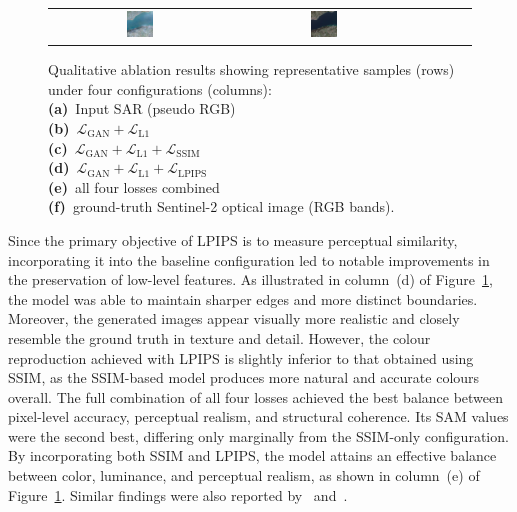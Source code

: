 \begin{figure}[!htbp]
\begin{tabular}{*{6}{c}}
        \includegraphics[width=0.155\textwidth]{img/ablation/sample_4/all.png}   &
        \includegraphics[width=0.155\textwidth]{img/ablation/sample_4/gt.png}                                  \\
    \end{tabular}

    \caption[Qualitative ablation study across loss configurations]{%
    Qualitative ablation results showing representative samples (rows) under four configurations (columns):\\
    \textbf{(a)}~Input SAR (pseudo RGB)\\
    \textbf{(b)}~$\mathcal{L}_{\text{GAN}}{+}\mathcal{L}_{\text{L1}}$\\
    \textbf{(c)}~$\mathcal{L}_{\text{GAN}}{+}\mathcal{L}_{\text{L1}}{+}\mathcal{L}_{\text{SSIM}}$\\
    \textbf{(d)}~$\mathcal{L}_{\text{GAN}}{+}\mathcal{L}_{\text{L1}}{+}\mathcal{L}_{\text{LPIPS}}$\\
    \textbf{(e)}~all four losses combined\\
    \textbf{(f)}~ground-truth Sentinel-2 optical image (RGB bands).
    }
    \label{fig:ablation_samples}
\end{figure}

Since the primary objective of LPIPS is to measure perceptual similarity, incorporating it into the baseline configuration led to notable improvements in the preservation of low-level features. As illustrated in column~(d) of Figure~\ref{fig:ablation_samples}, the model was able to maintain sharper edges and more distinct boundaries. Moreover, the generated images appear visually more realistic and closely resemble the ground truth in texture and detail. However, the colour reproduction achieved with LPIPS is slightly inferior to that obtained using SSIM, as the SSIM-based model produces more natural and accurate colours overall.
The full combination of all four losses achieved the best balance between pixel-level accuracy, perceptual realism, and structural coherence. 
Its SAM values were the second best, differing only marginally from the SSIM-only configuration. 
By incorporating both SSIM and LPIPS, the model attains an effective balance between color, luminance, and perceptual realism, as shown in column~(e) of Figure~\ref{fig:ablation_samples}. 
Similar findings were also reported by~\cite{s2o_ViT_cGAN} and~\cite{CR_RS_GAN_s2o}. 
 
